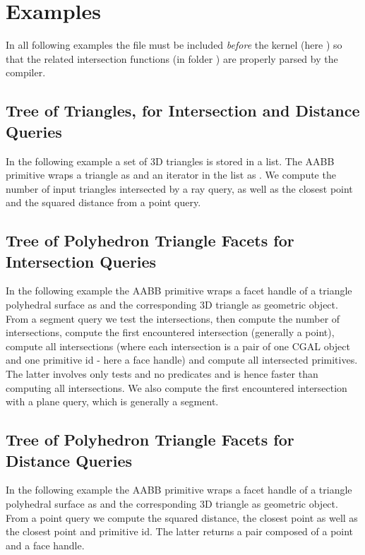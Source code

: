 \section{Examples}
\label{AABB_tree_section_examples}

In all following examples the file  must be included \emph{before} the kernel (here ) so that the related intersection functions (in folder ) are properly parsed by the compiler.

\subsection{Tree of Triangles, for Intersection and Distance Queries}
In the following example a set of 3D triangles is stored in a list. The AABB primitive wraps a triangle as  and an iterator in the list as . We compute the number of input triangles intersected by a ray query, as well as the closest point and the squared distance from a point query.  

\subsection{Tree of Polyhedron Triangle Facets for Intersection Queries}
In the following example the AABB primitive wraps a facet handle of a triangle polyhedral surface as  and the corresponding 3D triangle as geometric object. From a segment query we test the intersections, then compute the number of intersections, compute the first encountered intersection (generally a point), compute all intersections (where each intersection is a pair of one CGAL object and one primitive id - here a face handle) and compute all intersected primitives. The latter involves only tests and no predicates and is hence faster than computing all intersections. We also compute the first encountered intersection with a plane query, which is generally a segment.

\subsection{Tree of Polyhedron Triangle Facets for Distance Queries}
In the following example the AABB primitive wraps a facet handle of a triangle polyhedral surface as  and the corresponding 3D triangle as geometric object. From a point query we compute the squared distance, the closest point as well as the closest point and primitive id. The latter returns a pair composed of a point and a face handle. 

